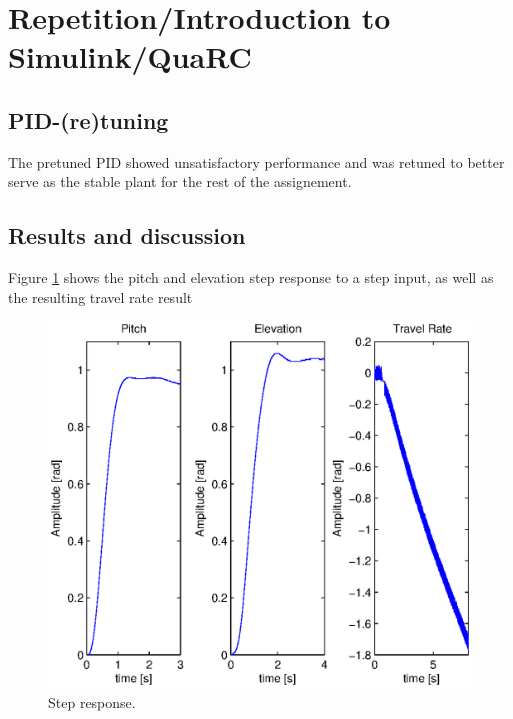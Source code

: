 \section{Repetition/Introduction to Simulink/QuaRC}\label{sec:prob1}

\subsection{PID-(re)tuning}
The pretuned PID showed unsatisfactory performance and was retuned to better serve as the stable plant for the rest of the assignement. 

\subsection{Results and discussion}

Figure \ref{fig:step_response} shows the pitch and elevation step response to a step input, as well as the resulting travel rate result

\begin{figure}[hp]
	\centering
		\includegraphics[width=1.00\textwidth]{figures/1/step_response.eps}
	\caption{Step response.}
	\label{fig:step_response}
\end{figure}

